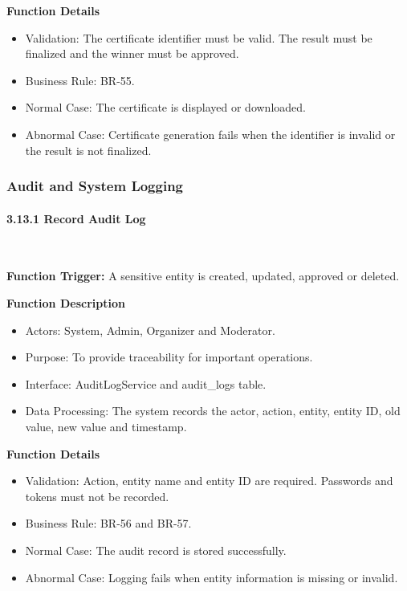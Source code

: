\textbf{Function Details}
\begin{itemize}[leftmargin=1.5em, nosep]
    \item Validation: The certificate identifier must be valid. The result must be finalized and the winner must be approved.
    \item Business Rule: BR-55.
    \item Normal Case: The certificate is displayed or downloaded.
    \item Abnormal Case: Certificate generation fails when the identifier is invalid or the result is not finalized.
\end{itemize}

\subsubsection{Audit and System Logging}
\label{subsubsec:audit-system-logging}

\paragraph*{3.13.1 Record Audit Log}\leavevmode\\[-0.5em]
\label{par:record-audit-log}

\textbf{Function Trigger:} A sensitive entity is created, updated, approved or deleted.

\textbf{Function Description}
\begin{itemize}[leftmargin=1.5em, nosep]
    \item Actors: System, Admin, Organizer and Moderator.
    \item Purpose: To provide traceability for important operations.
    \item Interface: AuditLogService and audit\_logs table.
    \item Data Processing: The system records the actor, action, entity, entity ID, old value, new value and timestamp.
\end{itemize}

\textbf{Function Details}
\begin{itemize}[leftmargin=1.5em, nosep]
    \item Validation: Action, entity name and entity ID are required. Passwords and tokens must not be recorded.
    \item Business Rule: BR-56 and BR-57.
    \item Normal Case: The audit record is stored successfully.
    \item Abnormal Case: Logging fails when entity information is missing or invalid.
\end{itemize}

